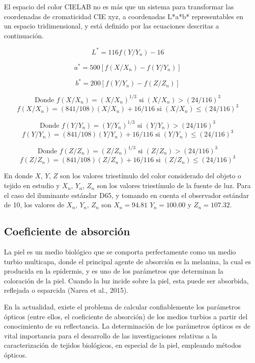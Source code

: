 		El espacio del color CIELAB no es m\'{a}s que un sistema para transformar las coordenadas de cromaticidad CIE xyz, a coordenadas L*a*b* representables en un espacio tridimensional, y est\'{a} definido por las ecuaciones descritas a continuaci\'{o}n.
		
		$$L^* = 116f(Y/Y_n) - 16$$
		
		$$a^* = 500[f(X/X_n) - f(Y/Y_n)]$$
		
		$$b^* = 200[f(Y/Y_n) - f(Z/Z_n)]$$
		
		$$\text{Donde } f(X/X_n) = (X/X_n)^{1/3} \text{ si } (X/X_n) > (24/116)^3$$
		$$f(X/X_n) = (841/108)(X/X_n) + 16/116 \text{ si } (X/X_n) \leq (24/116)^3$$
		
		$$\text{Donde } f(Y/Y_n) = (Y/Y_n)^{1/3} \text{ si } (Y/Y_n) > (24/116)^3$$
		$$f(Y/Y_n) = (841/108)(Y/Y_n) + 16/116 \text{ si } (Y/Y_n) \leq (24/116)^3$$
		
		$$\text{Donde } f(Z/Z_n) = (Z/Z_n)^{1/3} \text{ si } (Z/Z_n) > (24/116)^3$$
		$$f(Z/Z_n) = (841/108)(Z/Z_n) + 16/116 \text{ si } (Z/Z_n) \leq (24/116)^3$$
		
		En donde $X$, $Y$, $Z$ son los valores triest\'{i}mulo del color considerado del objeto o tejido en estudio y $X_n$, $Y_n$, $Z_n$ son los valores triest\'{i}mulo de la fuente de luz. Para el caso del iluminante est\'{a}ndar D65, y tomando en cuenta el observador est\'{a}ndar de 10\degree, los valores de $X_n$, $Y_n$, $Z_n$ son $X_n = 94.81$ $Y_n = 100.00$ y $Z_n = 107.32$.

	\subsection{Coeficiente de absorci\'{o}n}
	
		La piel es un medio biol\'{o}gico que se comporta perfectamente como un medio turbio multicapa, donde el principal agente de absorci\'{o}n es la melanina, la cual es producida en la epidermis, y es uno de los par\'{a}metros que determinan la coloraci\'{o}n de la piel. Cuando la luz incide sobre la piel, esta puede ser absorbida, reflejada o esparcida (Narea et al., 2015).
		
		En la actualidad, existe el problema de calcular confiablemente los par\'{a}metros \'{o}pticos (entre ellos, el coeficiente de absorci\'{o}n) de los medios turbios a partir del conocimiento de su reflectancia. La determinaci\'{o}n de los par\'{a}metros \'{o}pticos es de vital importancia para el desarrollo de las investigaciones relativas a la caracterizaci\'{o}n de tejidos biol\'{o}gicos, en especial de la piel, empleando m\'{e}todos \'{o}pticos.
		
